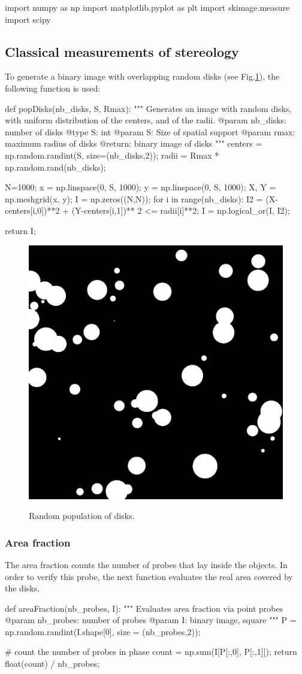 \def\QRCODE{TB_IPR_TUT.IMG.stereology_pythonqrcode.png}
\def\QRPAGE{http://www.iptutorials.science/tree/master/TB_IPR/TUT.IMG.stereology/python}

\begin{python}
import numpy as np
import matplotlib.pyplot as plt
import skimage.measure
import scipy
\end{python}

\subsection{Classical measurements of stereology}

To generate a binary image with overlapping random disks (see Fig.\ref{fig:stereology:python:disks}), the following function is used:
\begin{python}
def popDisks(nb_disks, S, Rmax):
    """ Generates an image with random disks, with uniform distribution of the centers, and of the radii.
    @param nb_disks: number of disks
    @type S: int
    @param S: Size of spatial support
    @param rmax: maximum radius of disks
    @return: binary image of disks
    """
    centers = np.random.randint(S, size=(nb_disks,2));
    radii = Rmax * np.random.rand(nb_disks);
    
    N=1000;
    x = np.linspace(0, S, 1000);
    y = np.linspace(0, S, 1000);
    X, Y = np.meshgrid(x, y);
    I = np.zeros((N,N));
    for i in range(nb_disks):
        I2 = (X-centers[i,0])**2 + (Y-centers[i,1])** 2 <= radii[i]**2;
        I = np.logical_or(I, I2);
        
    return I;
\end{python}

\begin{figure}[htbp]
 \centering\caption{Random population of disks.}%
 \includegraphics[width=.3\textwidth]{disques.png}%
 \label{fig:stereology:python:disks}%
\end{figure}

\subsubsection{Area fraction}
The area fraction counts the number of probes that lay inside the objects. In order to verify this probe, the next function evaluates the real area covered by the disks.
\begin{python}
def areaFraction(nb_probes, I):
    """
    Evaluates area fraction via point probes
    @param nb_probes: number of probes
    @param I: binary image, square
    """
    P = np.random.randint(I.shape[0], size = (nb_probes,2));

    # count the number of probes in phase
    count = np.sum(I[P[:,0], P[:,1]]);
    return float(count) / nb_probes;
\end{python}

